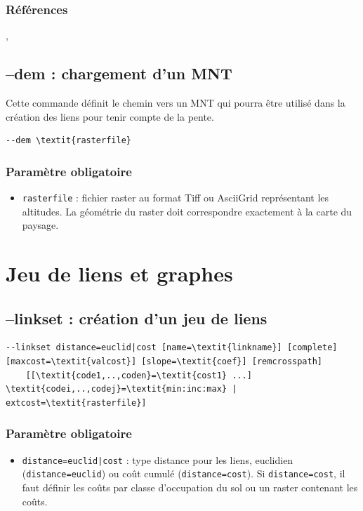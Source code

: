 \documentclass[a4paper,10pt]{report}
\begin{document}
\subsubsection{Références}
\cite{2015_monkey}, \cite{2016_campagnole}

\subsection{--dem : chargement d'un MNT}
Cette commande définit le chemin vers un MNT qui pourra être utilisé dans la création des liens pour tenir compte de la pente.
\begin{Verbatim}[commandchars=\\\{\}]
--dem \textit{rasterfile}
\end{Verbatim}

\subsubsection{Paramètre obligatoire}
\begin{itemize}
	\item \verb|rasterfile| : fichier raster au format Tiff ou AsciiGrid représentant les altitudes. La géométrie du raster doit correspondre exactement à la carte du paysage.
\end{itemize}

\section{Jeu de liens et graphes}

\subsection{--linkset : création d'un jeu de liens}
\begin{Verbatim}[commandchars=\\\{\}]
--linkset distance=euclid|cost [name=\textit{linkname}] [complete] [maxcost=\textit{valcost}] [slope=\textit{coef}] [remcrosspath] 
	[[\textit{code1,..,coden}=\textit{cost1} ...] \textit{codei,..,codej}=\textit{min:inc:max} | extcost=\textit{rasterfile}]
\end{Verbatim}

\subsubsection{Paramètre obligatoire}
\begin{itemize}
	\item \verb+distance=euclid|cost+ : type distance pour les liens, euclidien (\verb|distance=euclid|) ou coût cumulé (\verb|distance=cost|). Si \verb|distance=cost|, il faut définir les coûts par classe d'occupation du sol ou un raster contenant les coûts.
\end{itemize}
\end{document}
